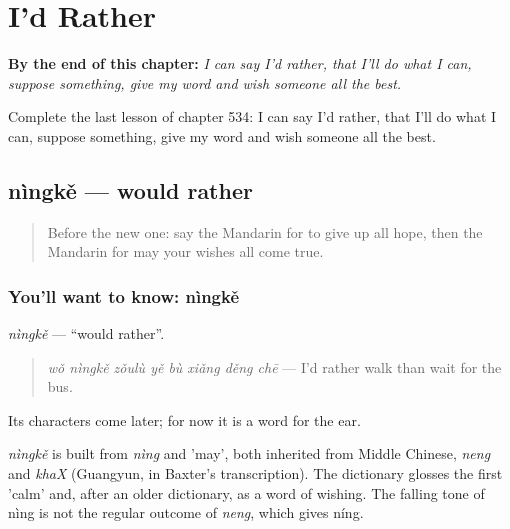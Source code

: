 
\chapter{I'd Rather}
\label{ch:zh-i-d-rather}

\begin{chapteropening}
\textbf{By the end of this chapter:} \emph{I can say I'd rather, that I'll do what I can, suppose something, give my word and wish someone all the best.}

Complete the last lesson of chapter 534: I can say I'd rather, that I'll do what I can, suppose something, give my word and wish someone all the best.
\end{chapteropening}

\section[nìngkě]{nìngkě — would rather}

\label{lesson:ZH-C534-ningke}



\begin{quote}
Before the new one: say the Mandarin for to give up all hope, then the Mandarin for may your wishes all come true.
\end{quote}

\subsection*{You'll want to know: nìngkě}
\emph{nìngkě} — \textquotedblleft{}would rather\textquotedblright{}.

\begin{quote}
\emph{wǒ nìngkě zǒulù yě bù xiǎng děng chē} — I'd rather walk than wait for the bus.
\end{quote}

Its characters come later; for now it is a word for the ear.

\begin{cousinweb}
\emph{nìngkě} is built from \emph{nìng} and  'may', both inherited from Middle Chinese, \emph{neng} and \emph{khaX} (Guangyun, in Baxter's transcription). The dictionary glosses the first 'calm' and, after an older dictionary, as a word of wishing. The falling tone of nìng is not the regular outcome of \emph{neng}, which gives níng.
\end{cousinweb}

